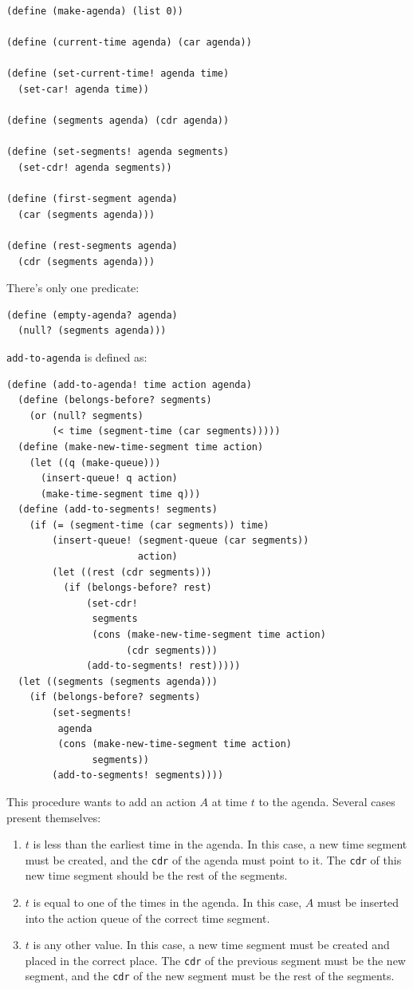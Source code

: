 \documentclass[9pt]{report}
\begin{document}
\begin{verbatim}
(define (make-agenda) (list 0))

(define (current-time agenda) (car agenda))

(define (set-current-time! agenda time)
  (set-car! agenda time))

(define (segments agenda) (cdr agenda))

(define (set-segments! agenda segments)
  (set-cdr! agenda segments))

(define (first-segment agenda)
  (car (segments agenda)))

(define (rest-segments agenda)
  (cdr (segments agenda)))
\end{verbatim}

There's only one predicate:

\begin{verbatim}
(define (empty-agenda? agenda)
  (null? (segments agenda)))
\end{verbatim}

\texttt{add-to-agenda} is defined as:

\begin{verbatim}
(define (add-to-agenda! time action agenda)
  (define (belongs-before? segments)
    (or (null? segments)
        (< time (segment-time (car segments)))))
  (define (make-new-time-segment time action)
    (let ((q (make-queue)))
      (insert-queue! q action)
      (make-time-segment time q)))
  (define (add-to-segments! segments)
    (if (= (segment-time (car segments)) time)
        (insert-queue! (segment-queue (car segments))
                       action)
        (let ((rest (cdr segments)))
          (if (belongs-before? rest)
              (set-cdr!
               segments
               (cons (make-new-time-segment time action)
                     (cdr segments)))
              (add-to-segments! rest)))))
  (let ((segments (segments agenda)))
    (if (belongs-before? segments)
        (set-segments!
         agenda
         (cons (make-new-time-segment time action)
               segments))
        (add-to-segments! segments))))
\end{verbatim}

This procedure wants to add an action \(A\) at time \(t\) to the
agenda. Several cases present themselves:

\begin{enumerate}
\item \(t\) is less than the earliest time in the agenda. In this case,
a new time segment must be created, and the \texttt{cdr} of the agenda
must point to it. The \texttt{cdr} of this new time segment should be
the rest of the segments.
\item \(t\) is equal to one of the times in the agenda. In this case,
\(A\) must be inserted into the action queue of the correct time
segment.
\item \(t\) is any other value. In this case, a new time segment must
be created and placed in the correct place. The \texttt{cdr} of the
previous segment must be the new segment, and the \texttt{cdr} of the
new segment must be the rest of the segments.
\end{enumerate}
\end{document}

